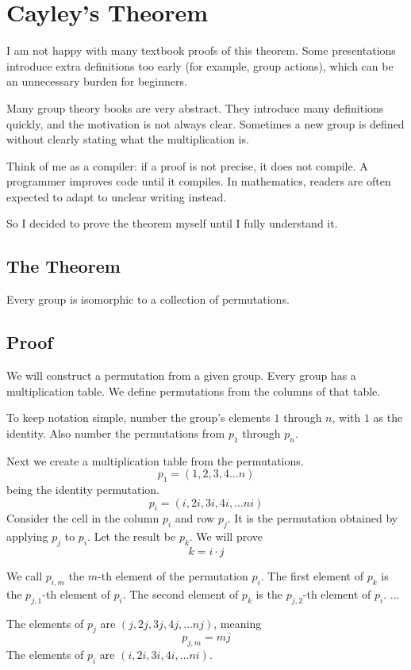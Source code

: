 \chapter{Cayley's Theorem}
I am not happy with many textbook proofs of this theorem.
Some presentations introduce extra definitions too early
(for example, group actions), which can be an unnecessary burden
for beginners.

Many group theory books are very abstract. They introduce many
definitions quickly, and the motivation is not always clear.
Sometimes a new group is defined without clearly stating
what the multiplication is.

Think of me as a compiler: if a proof is not precise, it does not compile.
A programmer improves code until it compiles. In mathematics, readers are
often expected to adapt to unclear writing instead.

So I decided to prove the theorem myself until I fully understand it.


\section{The Theorem}
Every group is isomorphic to a collection of permutations.

\section{Proof}
We will construct a permutation from a given group. 
Every group has a multiplication table. We define permutations
from the columns of that table.

To keep notation simple, number the group's elements
\(1\) through \(n\), with \(1\) as the identity.
Also number the permutations from \(p_1\) through \(p_n\).

Next we create a multiplication table from the permutations.
\[
p_1=(1, 2, 3, 4 \dots n)
\]
being the identity permutation.
\[
p_i = (i, 2i, 3i, 4i, \dots ni)
\]
Consider the cell in the column \(p_i\) and row \(p_j\).
It is the permutation obtained by applying \(p_j\) to \(p_i\).
Let the result be \(p_k\). We will prove
\[k = i \cdot j\]

We call \(p_{i,m}\) the \(m\)-th element of the permutation \(p_i\).
The first element of \(p_k\) is the \(p_{j,1}\)-th element of \(p_i\).
The second element of \(p_k\) is the \(p_{j,2}\)-th element of \(p_i\).
...

The elements of \(p_j\) are \((j, 2j, 3j, 4j, \dots nj)\), meaning
\[
p_{j,m} = mj
\]
The elements of \(p_i\) are \((i, 2i, 3i, 4i, \dots ni)\).

